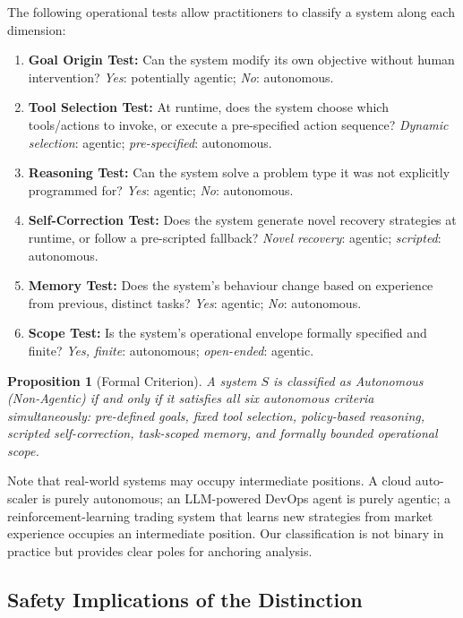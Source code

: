 \documentclass[12pt, a4paper]{article}
\newtheorem{proposition}{Proposition}
\begin{document}
The following operational tests allow practitioners to classify a system along each dimension:

\begin{enumerate}
    \item \textbf{Goal Origin Test:} Can the system modify its own objective without human intervention? \emph{Yes}: potentially agentic; \emph{No}: autonomous.
    \item \textbf{Tool Selection Test:} At runtime, does the system choose which tools/actions to invoke, or execute a pre-specified action sequence? \emph{Dynamic selection}: agentic; \emph{pre-specified}: autonomous.
    \item \textbf{Reasoning Test:} Can the system solve a problem type it was not explicitly programmed for? \emph{Yes}: agentic; \emph{No}: autonomous.
    \item \textbf{Self-Correction Test:} Does the system generate novel recovery strategies at runtime, or follow a pre-scripted fallback? \emph{Novel recovery}: agentic; \emph{scripted}: autonomous.
    \item \textbf{Memory Test:} Does the system's behaviour change based on experience from previous, distinct tasks? \emph{Yes}: agentic; \emph{No}: autonomous.
    \item \textbf{Scope Test:} Is the system's operational envelope formally specified and finite? \emph{Yes, finite}: autonomous; \emph{open-ended}: agentic.
\end{enumerate}

\begin{proposition}[Formal Criterion]
A system $S$ is classified as \emph{Autonomous (Non-Agentic)} if and only if it satisfies all six autonomous criteria simultaneously: pre-defined goals, fixed tool selection, policy-based reasoning, scripted self-correction, task-scoped memory, and formally bounded operational scope.
\end{proposition}

Note that real-world systems may occupy intermediate positions. A cloud auto-scaler is purely autonomous; an LLM-powered DevOps agent is purely agentic; a reinforcement-learning trading system that learns new strategies from market experience occupies an intermediate position. Our classification is not binary in practice but provides clear poles for anchoring analysis.

\subsection{Safety Implications of the Distinction}
\end{document}

